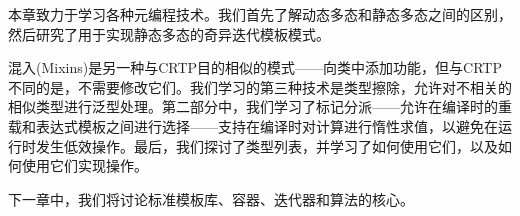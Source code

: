 本章致力于学习各种元编程技术。我们首先了解动态多态和静态多态之间的区别，然后研究了用于实现静态多态的奇异迭代模板模式。

混入(Mixins)是另一种与CRTP目的相似的模式——向类中添加功能，但与CRTP不同的是，不需要修改它们。我们学习的第三种技术是类型擦除，允许对不相关的相似类型进行泛型处理。第二部分中，我们学习了标记分派——允许在编译时的重载和表达式模板之间进行选择——支持在编译时对计算进行惰性求值，以避免在运行时发生低效操作。最后，我们探讨了类型列表，并学习了如何使用它们，以及如何使用它们实现操作。

下一章中，我们将讨论标准模板库、容器、迭代器和算法的核心。